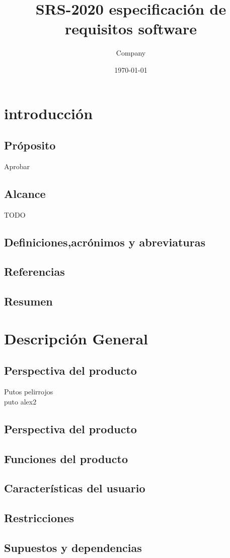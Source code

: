\documentclass{article}
\title{SRS-2020 especificación de requisitos software }
\author{Company }
\date{\today}
\begin{document}
\maketitle


\section{introducción}
\subsection{Próposito}
Aprobar
\subsection{Alcance}
TODO
\subsection{Definiciones,acrónimos y abreviaturas}
\subsection{Referencias}
\subsection{Resumen}
\section{Descripción General }
\subsection{Perspectiva del producto}
Putos pelirrojos\\
puto alex2
\subsection{Perspectiva del producto}
\subsection{Funciones del producto}
\subsection{Características del usuario}
\subsection{Restricciones}
\subsection{Supuestos y dependencias}
\end{document}
